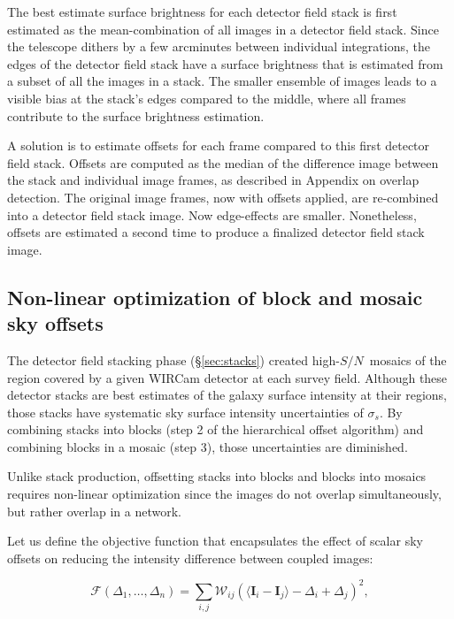 \documentclass[iop]{emulateapj}
\newcommand{\vect}[1]{\boldsymbol{#1}} %
\newcommand{\sn}{\ensuremath{S/N}} %
\newcommand{\todo}[1]{\textcolor{RedOrange}{#1}} %
\begin{document}
The best estimate surface brightness for each detector field stack is first estimated as the mean-combination of all images in a detector field stack.  Since the telescope dithers by a few arcminutes between individual integrations, the edges of the detector field stack have a surface brightness that is estimated from a subset of all the images in a stack. The smaller ensemble of images leads to a visible bias at the stack's edges compared to the middle, where all frames contribute to the surface brightness estimation.

A solution is to estimate offsets for each frame compared to this first detector field stack. Offsets are computed as the median of the difference image between the stack and individual image frames, as described in \todo{Appendix on overlap detection}. The original image frames, now with offsets applied, are re-combined into a detector field stack image. Now edge-effects are smaller. Nonetheless, offsets are estimated a second time to produce a finalized detector field stack image.

\subsection{Non-linear optimization of block and mosaic sky offsets}

The detector field stacking phase (\S \ref{sec:stacks}) created high-\sn\ mosaics of the region covered by a given WIRCam detector at each survey field. Although these detector stacks are best estimates of the galaxy surface intensity at their regions, those stacks have systematic sky surface intensity uncertainties of $\sigma_s$. By combining stacks into blocks (step 2 of the hierarchical offset algorithm) and combining blocks in a mosaic (step 3), those uncertainties are diminished.

Unlike stack production, offsetting stacks into blocks and blocks into mosaics requires non-linear optimization since the images do not overlap simultaneously, but rather overlap in a network.

Let us define the objective function that encapsulates the effect of scalar sky offsets on reducing the intensity difference between coupled images:

\begin{equation}
    \mathcal{F} \left(\Delta_1,\ldots,\Delta_n \right) = \sum_{i,j} \mathcal{W}_{ij} \left( \langle \vect{I}_i - \vect{I}_j \rangle - \Delta_i + \Delta_j \right)^2,
    \label{eq:objf}
\end{equation}
\end{document}
